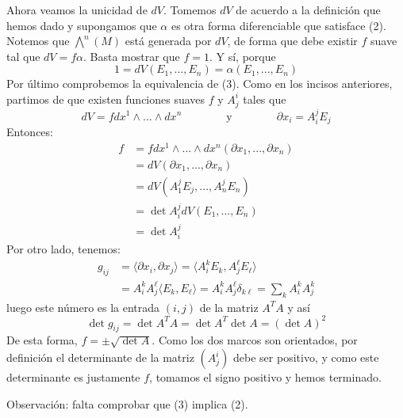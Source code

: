 \documentclass[11pt]{article}
\theoremstyle{definition}
\begin{document}
Ahora veamos la unicidad de $dV$. Tomemos $dV$ de acuerdo a la definición que hemos dado y supongamos que $\alpha$ es otra forma diferenciable que satisface (2). Notemos que $\bigwedge^n(M)$ está generada por $dV$, de forma que debe existir $f$ suave tal que $dV=f\alpha$. Basta mostrar que $f=1$. Y sí, porque
$$1=dV(E_1,...,E_n)=\alpha(E_1,...,E_n)$$
Por último comprobemos la equivalencia de (3). Como en los incisos anteriores, partimos de que existen funciones suaves $f$ y $A^i_j$ tales que
$$dV=fdx^1\wedge...\wedge dx^n \qquad\qquad \text{y} \qquad \qquad\partial x_i=A^j_iE_j$$
Entonces:
\begin{align*}
f&=fdx^1\wedge...\wedge dx^n(\partial x_1,...,\partial x_n)\\
&=dV(\partial x_1,...,\partial x_n)\\
&=dV(A^j_1E_j,...,A^j_nE_n)\\
&=\det{A^j_i}dV(E_1,...,E_n)\\
&=\det{A^j_i}
\end{align*}
Por otro lado, tenemos:
\begin{align*}g_{ij}&=\langle \partial x_i,\partial x_j\rangle=\langle A^k_i E_k,A^\ell_jE_\ell\rangle\\
&=A^k_iA^\ell_j\langle E_k,E_\ell\rangle=A^k_iA^\ell_j\delta_{k\ell}=\sum_kA^k_iA^k_j
\end{align*}
luego este número es la entrada $(i,j)$ de la matriz $A^TA$ y así
$$\det{g_{ij}}=\det{A^TA}=\det{A^T}\det{A}=(\det{A})^2$$
De esta forma, $f=\pm\sqrt{\det{A}}$. Como los dos marcos son orientados, por definición el determinante de la matriz $(A^i_j)$ debe ser positivo, y como este determinante es justamente $f$, tomamos el signo positivo y hemos terminado.\par
Observación: falta comprobar que (3) implica (2).\newpage
\end{document}
